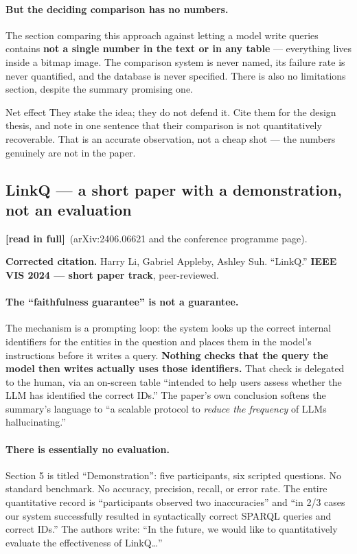\documentclass[11pt,a4paper]{article}
\newcommand{\readtag}{\textcolor{standing}{\textbf{[read in full]}}}
\begin{document}
\paragraph{But the deciding comparison has no numbers.} The section comparing this
approach against letting a model write queries contains \textbf{not a single
number in the text or in any table} --- everything lives inside a bitmap image. The
comparison system is never named, its failure rate is never quantified, and the
database is never specified. There is also no limitations section, despite the
summary promising one.

\begin{keybox}{Net effect}
They stake the idea; they do not defend it. Cite them for the design thesis, and
note in one sentence that their comparison is not quantitatively recoverable.
That is an accurate observation, not a cheap shot --- the numbers genuinely are not
in the paper.
\end{keybox}

\subsection{LinkQ --- a short paper with a demonstration, not an evaluation}

\readtag\ (arXiv:2406.06621 and the conference programme page).

\textbf{Corrected citation.} Harry Li, Gabriel Appleby, Ashley Suh. ``LinkQ.''
\textbf{IEEE VIS 2024 --- short paper track}, peer-reviewed.

\paragraph{The ``faithfulness guarantee'' is not a guarantee.} The mechanism is a
prompting loop: the system looks up the correct internal identifiers for the
entities in the question and places them in the model's instructions before it
writes a query. \textbf{Nothing checks that the query the model then writes
actually uses those identifiers.} That check is delegated to the human, via an
on-screen table ``intended to help users assess whether the LLM has identified the
correct IDs.'' The paper's own conclusion softens the summary's language to ``a
scalable protocol to \emph{reduce the frequency} of LLMs hallucinating.''

\paragraph{There is essentially no evaluation.} Section 5 is titled
``Demonstration'': five participants, six scripted questions. No standard
benchmark. No accuracy, precision, recall, or error rate. The entire quantitative
record is ``participants observed two inaccuracies'' and ``in 2/3 cases our system
successfully resulted in syntactically correct SPARQL queries and correct IDs.''
The authors write: ``In the future, we would like to quantitatively evaluate the
effectiveness of LinkQ\ldots''
\end{document}
